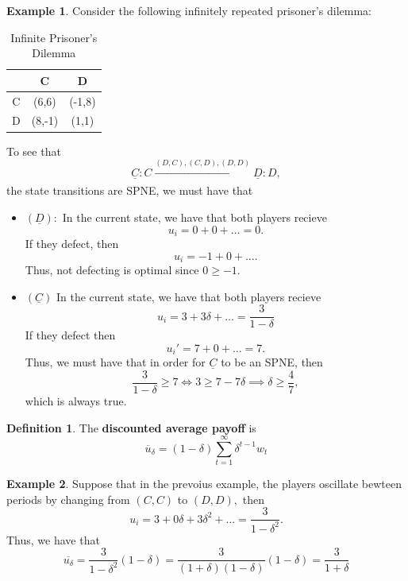 \documentclass[10pt, oneside]{article}
\theoremstyle{definition}
\newtheorem{exmp}{Example}[section]
\newtheorem{defn}{Definition}
\begin{document}
\begin{exmp}
Consider the following infinitely repeated prisoner's dilemma:
    \begin{table}[H]
        \centering
        \begin{tabular}{c|c|c}
             & C & D\\
             \hline
             C& (6,6) & (-1,8) \\
             \hline
             D&  (8,-1)& (1,1)\\
        \end{tabular}
        \caption{Infinite Prisoner's Dilemma}
    \end{table}
To see that 
\[\boxed{\underline{C}: C}\xrightarrow[]{(D,C), (C,D),(D,D)} \boxed{\underline{D}: D},\] the state transitions are SPNE, we must have that
    \begin{itemize}
        \item $(\underline{D}):$ In the current state, we have that both players recieve
        \[u_i = 0 + 0 + \dots = 0.\] If they defect, then 
        \[u_i = -1 + 0 + \dots.\] Thus, not defecting is optimal since $0\geq -1.$
        \item $(\underline{C})$  In the current state, we have that both players recieve
        \[u_i = 3 + 3\delta + \dots = \frac{3}{1-\delta}\] If they defect then 
        \[u_i' = 7  + 0 + \dots = 7.\] Thus, we must have that in order for $\underline{C}$ to be an SPNE, then 
        \[\frac{3}{1-\delta} \geq 7 \iff 3 \geq 7 - 7\delta \implies \delta \geq \frac{4}{7},\] which is always true. 
    \end{itemize}
\end{exmp}

\begin{defn}
    The \textbf{discounted average payoff} is 
    \[\overline{u}_\delta = (1-\delta)\sum_{t=1}^\infty \delta^{t-1}w_t\]
\end{defn}
\begin{exmp}
    Suppose that in the prevoius example, the players oscillate bewteen periods by changing from $(C,C)$ to $(D,D),$ then 
    \[u_i = 3 + 0\delta + 3\delta^2 + \dots = \frac{3}{1-\delta^2}.\] Thus, we have that 
    \[\overline{u_\delta} = \frac{3}{1-\delta^2}(1-\delta) = \frac{3}{(1 + \delta)(1-\delta)}(1-\delta) = \frac{3}{1+ \delta}\]
\end{exmp}
\end{document}
